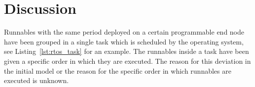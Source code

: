 \section{Discussion}
\label{sec:discussion}

Runnables with the same period deployed on a certain programmable end node have been grouped in a single task which is scheduled by the operating system, see Listing~\ref{lst:rtos_task} for an example. The runnables inside a task have been given a specific order in which they are executed. The reason for this deviation in the initial model or the reason for the specific order in which runnables are executed is unknown. 



